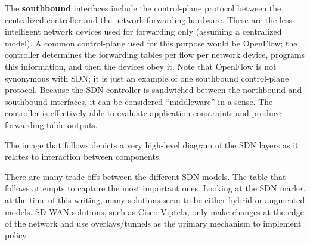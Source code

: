 The \textbf{southbound} interfaces include the control-plane protocol between the
centralized controller and the network forwarding hardware. These are the less
intelligent network devices used for forwarding only (assuming a centralized
model). A common control-plane used for this purpose would be OpenFlow; the
controller determines the forwarding tables per flow per network device,
programs this information, and then the devices obey it. Note that OpenFlow is
not synonymous with SDN\@; it is just an example of one southbound control-plane
protocol. Because the SDN controller is sandwiched between the northbound and
southbound interfaces, it can be considered ``middleware'' in a sense. The
controller is effectively able to evaluate application constraints and produce
forwarding-table outputs.

The image that follows depicts a very high-level diagram of the SDN layers as
it relates to interaction between components.


There are many trade-offs between the different SDN models. The table that follows
attempts to capture the most important ones. Looking at the SDN market at the
time of this writing, many solutions seem to be either hybrid or augmented
models. SD-WAN solutions, such as Cisco Viptela, only make changes at the edge
of the network and use overlays/tunnels as the primary mechanism to implement policy.

